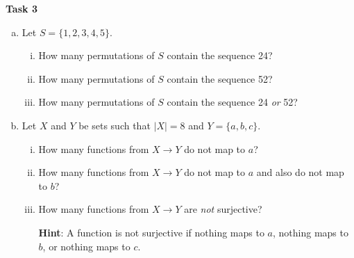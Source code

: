 \documentclass[12pt,letterpaper]{article}
\newcommand\hint[1]{\textbf{Hint}: #1}
\newenvironment{22enumerate}{\begin{enumerate}[a.]\itemsep0em}{\end{enumerate}}
\begin{document}
\textbf{Task 3}
\begin{22enumerate}
    \item Let $S=\{1, 2, 3, 4, 5\}$.
    \begin{enumerate}[i.]
        \item How many permutations of $S$ contain the sequence 24?
        \begin{mdframed} \vspace{1cm} \end{mdframed}
        \item How many permutations of $S$ contain the sequence 52?
        \begin{mdframed} \vspace{1cm} \end{mdframed}
        \item How many permutations of $S$ contain the sequence 24 \textit{or} 52?
        \begin{mdframed} \vspace{1cm} \end{mdframed}
    \end{enumerate}
    \item Let $X$ and $Y$ be sets such that $|X| = 8$ and $Y = \{a, b, c\}$.
    \begin{enumerate}[i.]
        \item How many functions from $X \rightarrow Y$ do not map to $a$?
        \begin{mdframed} \vspace{1cm} \end{mdframed}
        \item How many functions from $X \rightarrow Y$ do not map to $a$ and also do not map to $b$? 
        \begin{mdframed} \vspace{1cm} \end{mdframed}
        \item How many functions from $X \rightarrow Y$ are \textit{not} surjective?
        
        \hint{A function is not surjective if nothing maps to $a$, nothing maps to $b$, or nothing maps to $c$.}
        \begin{mdframed} \vspace{3cm} \end{mdframed}
    \end{enumerate}
    
    
    
\end{22enumerate}
\end{document}
